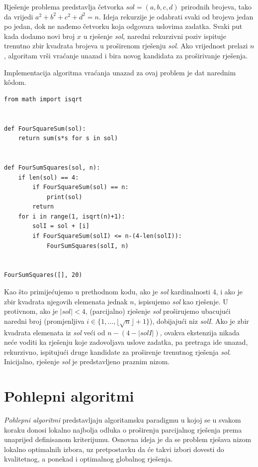 \begin{solution}
	Rješenje problema predstavlja četvorka $sol = (a, b, c, d)$ prirodnih brojeva, tako da vrijedi $a^2 + b^2 + c^2 + d^2 = n$. Ideja rekurzije je odabrati svaki  od brojeva jedan po jedan, dok ne nađemo četvorku koja odgovara uslovima zadatka. Svaki put kada dodamo novi broj $x$ u rješenje \emph{sol}, naredni rekurzivni poziv ispituje trenutno zbir kvadrata brojeva u proširenom rješenju \emph{sol}. Ako vrijednost prelazi $n$, algoritam vrši vraćanje unazad i bira novog kandidata za proširivanje rješenja. 
	
 Implementacija algoritma vraćanja unazad za ovaj problem je dat narednim k\^odom.
 
 \begin{verbatim}
from math import isqrt


def FourSquareSum(sol):
    return sum(s*s for s in sol)


def FourSumSquares(sol, n):
    if len(sol) == 4:
        if FourSquareSum(sol) == n:
            print(sol)
        return
    for i in range(1, isqrt(n)+1):
        solI = sol + [i]
        if FourSquareSum(solI) <= n-(4-len(solI)):
            FourSumSquares(solI, n)


FourSumSquares([], 20)
\end{verbatim}
	
	Kao što primijećujemo u prethodnom kodu, ako je \emph{sol} kardinalnosti 4, i ako je zbir kvadrata njegovih elemenata jednak $n$, ispisujemo \emph{sol} kao rješenje. U protivnom, ako je $|sol|<4$, (parcijalno) rješenje \emph{sol} proširujemo ubacujući naredni broj (promjenljiva $i\in \{1, \ldots, \lfloor\sqrt{n} \rfloor + 1 \}$), dobijajući niz \emph{solI}.  Ako je zbir kvadrata elemenata iz \emph{sol} veći od $n-(4 - |solI|)$, ovakva ekstenzija nikada neće voditi ka rješenju koje zadovoljava uslove zadatka, pa pretraga ide unazad, rekurzivno,  ispitujući druge kandidate za proširenje trenutnog rješenja \emph{sol}. Inicijalno, rješenje \emph{sol} je predstavljeno praznim nizom.
	 
\end{solution}
 
 
\section{Pohlepni algoritmi}

\textit{Pohlepni algoritmi}  predstavljaju algoritamsku paradigmu u kojoj se u svakom koraku donosi lokalno najbolja odluka o proširenju parcijalnog rješenja prema unaprijed definisanom kriterijumu. Osnovna ideja je da se problem rješava nizom lokalno optimalnih izbora, uz pretpostavku da će takvi izbori dovesti do kvalitetnog, a ponekad i optimalnog globalnog rješenja.

